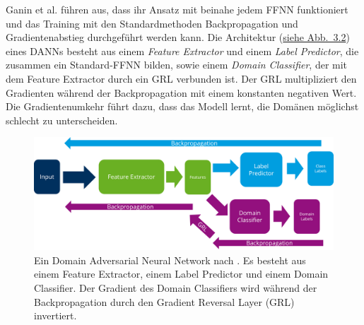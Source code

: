 Ganin et al. führen aus, dass ihr Ansatz mit beinahe jedem \gls{FFNN} funktioniert und das Training mit den Standardmethoden Backpropagation und Gradientenabstieg durchgeführt werden kann.
Die Architektur (\hyperref[fig:DANN_prinzip]{siehe Abb.~3.2}) eines \glspl{DANN} besteht aus einem \textit{Feature Extractor} und einem \textit{Label Predictor}, die zusammen ein Standard-\gls{FFNN} bilden, sowie einem \textit{Domain Classifier}, der mit dem Feature Extractor durch ein \gls{GRL} verbunden ist. Der \gls{GRL} multipliziert den Gradienten während der Backpropagation mit einem konstanten negativen Wert. Die Gradientenumkehr führt dazu, dass das Modell lernt, die Domänen möglichst schlecht zu unterscheiden. \cite{ganin_domain-adversarial_2016}

\begin{figure}[!ht]%
\centering
	\includegraphics[width=1.0\textwidth]{./Bilder/DANN_aufbau.png}
	\caption[Domain Adversarial Nerual Network Prinzip]{Ein Domain Adversarial Neural Network nach \cite{ganin_domain-adversarial_2016}. Es besteht aus einem Feature Extractor, einem Label Predictor und einem Domain Classifier. Der Gradient des Domain Classifiers wird während der Backpropagation durch den Gradient Reversal Layer (GRL) invertiert. }
\label{fig:DANN_prinzip}
\end{figure}

